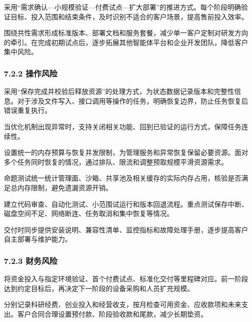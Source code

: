
采用``需求确认---小规模验证---付费试点---扩大部署''的推进方式。每个阶段明确验证目标、投入范围和结束条件，及时识别不适合的客户场景，提高售前投入效率。


围绕共性需求形成标准版本、部署文档和服务套餐，减少单一客户定制对研发方向的牵引。在完成初期试点后，逐步拓展其他智能体平台和企业开发团队，降低客户集中风险。

\subsubsection{7.2.2 操作风险}\label{ux64cdux4f5cux98ceux9669-1}


采用``保存完成并校验后释放资源''的处理方式，为状态数据记录版本和完整性信息。对于涉及文件写入、接口调用等操作的任务，明确恢复边界，防止任务恢复后错误重复执行。

当优化机制出现异常时，支持关闭相关功能、回到已验证的运行方式，保障任务连续性。


设置统一的内存预算与恢复并发限制，为管理服务和异常恢复保留必要资源。面对多个任务同时恢复的情况，通过排队、限流和调整预取规模平滑资源需求。

命题测试统一统计管理面、沙箱、共享池及相关缓存的实际内存占用，核验是否满足总内存限制，避免遗漏资源开销。


建立代码审查、自动化测试、小范围试运行和版本回退流程。重点测试保存中断、磁盘空间不足、网络断连、任务取消和集中恢复等情况。

交付时同步提供安装说明、兼容性清单、监控指标和故障处理手册，逐步提高客户自主部署与维护能力。

\subsubsection{7.2.3 财务风险}\label{ux8d22ux52a1ux98ceux9669-1}


将资金投入与指定环境验证、首个付费试点、标准化交付等里程碑对应。前一阶段达到约定目标后，再决定下一阶段的设备采购和人员扩充规模。


分别记录科研经费、创业投入和经营收支，按月检查可用资金、应收款项和未来支出。客户合同合理设置预付款、阶段验收款和尾款，减少长期垫资。

